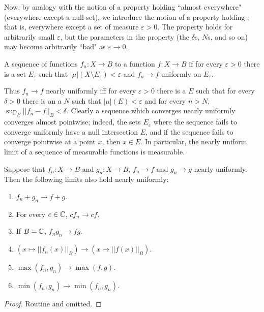 \begin{subsec}
Now, by analogy with the notion of a property holding ``almost everywhere" (everywhere except a null set), we introduce the notion of a property holding ; that is, everywhere except a set of measure $\varepsilon > 0$. The property holds for arbitrarily small $\varepsilon$, but the parameters in the property (the $\delta$s, $N$s, and so on) may become arbitrarily ``bad" as $\varepsilon \to 0$.
\end{subsec}

\begin{definition}
A sequence of functions $f_n: X \to B$  to a function $f: X \to B$ if for every $\varepsilon > 0$ there is a set $E_\varepsilon$ such that $|\mu|(X \setminus E_\varepsilon) < \varepsilon$ and $f_n \to f$ uniformly on $E_\varepsilon$.
\end{definition}

\begin{subsec}
Thus $f_n \to f$ nearly uniformly iff for every $\varepsilon > 0$ there is a $E$ such that for every $\delta > 0$ there is an a $N$ such that $|\mu|(E) < \varepsilon$ and for every $n > N$, $\sup_E ||f_n - f||_B < \delta$.
Clearly a sequence which converges nearly uniformly converges almost pointwise; indeed, the sets $E_\varepsilon$ where the sequence fails to converge uniformly have a null intersection $E$, and if the sequence fails to converge pointwise at a point $x$, then $x \in E$.
In particular, the nearly uniform limit of a sequence of measurable functions is measurable.
\end{subsec}

\begin{lemma}
Suppose that $f_n: X \to B$ and $g_n: X \to B$, $f_n \to f$ and $g_n \to g$ nearly uniformly. Then the following limits also hold nearly uniformly:
\begin{enumerate}
\item $f_n + g_n \to f + g$.
\item For every $c \in \mathbb{C}$, $cf_n \to cf$.
\item If $B = \mathbb{C}$, $f_ng_n \to fg$.
\item $(x \mapsto ||f_n(x)||_B) \to (x \mapsto ||f(x)||_B)$.
\item $\max(f_n, g_n) \to \max(f, g)$.
\item $\min(f_n, g_n) \to \min(f_n, g_n)$.
\end{enumerate}
\end{lemma}
\begin{proof}
Routine and omitted.
\end{proof}

